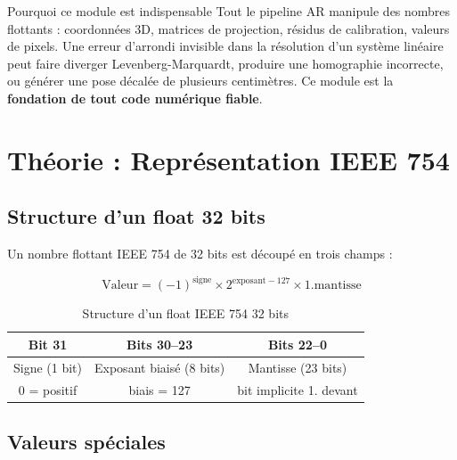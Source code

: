 \documentclass[12pt,a4paper]{report}
\begin{document}
\begin{theorybox}{Pourquoi ce module est indispensable}
Tout le pipeline AR manipule des nombres flottants : coordonnées 3D,
matrices de projection, résidus de calibration, valeurs de pixels. Une
erreur d'arrondi invisible dans la résolution d'un système linéaire peut
faire diverger Levenberg-Marquardt, produire une homographie incorrecte,
ou générer une pose décalée de plusieurs centimètres. Ce module est la
\textbf{fondation de tout code numérique fiable}.
\end{theorybox}

\section{Théorie : Représentation IEEE 754}

\subsection{Structure d'un float 32 bits}

Un nombre flottant IEEE 754 de 32 bits est découpé en trois champs :

\begin{equation}
    \text{Valeur} = (-1)^{\text{signe}} \times 2^{\text{exposant}-127}
    \times 1.\text{mantisse}
\end{equation}

\begin{table}[H]
    \centering
    \begin{tabular}{|c|c|c|}
        \hline
        \textbf{Bit 31} & \textbf{Bits 30--23} & \textbf{Bits 22--0} \\
        \hline
        Signe (1 bit) & Exposant biaisé (8 bits) & Mantisse (23 bits) \\
        0 = positif & biais = 127 & bit implicite 1. devant \\
        \hline
    \end{tabular}
    \caption{Structure d'un float IEEE 754 32 bits}
\end{table}

\subsection{Valeurs spéciales}
\end{document}
